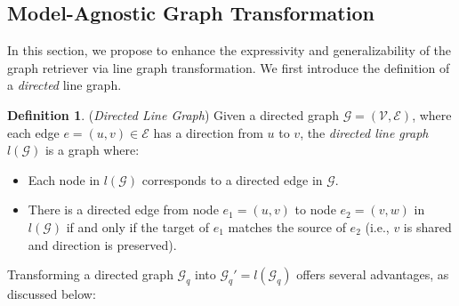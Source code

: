 \documentclass{article}
\theoremstyle{plain}
\theoremstyle{definition}
\newtheorem{definition}{Definition}
\theoremstyle{remark}
\newcommand{\ti}[1]{\textit{#1}}
\newcommand{\mcal}[1]{\mathcal{#1}}
\begin{document}
\subsection{Model-Agnostic Graph Transformation}
In this section, we propose to enhance the expressivity and generalizability of the graph retriever via line graph transformation.
We first introduce the definition of a \ti{directed} line graph.
\begin{definition} (\textit{Directed Line Graph}) \label{line_graph}
Given a directed graph $\mcal{G} = (\mcal{V}, \mcal{E})$, where each edge $e = (u, v) \in \mcal{E}$ has a direction from $u$ to $v$, the \textit{directed line graph} $l(\mcal{G})$ is a graph where:
\begin{itemize}
    \item Each node in $l(\mcal{G})$ corresponds to a directed edge in $\mcal{G}$.
    \item There is a directed edge from node $e_1 = (u, v)$ to node $e_2 = (v, w)$ in $l(\mcal{G})$ if and only if the target of $e_1$ matches the source of $e_2$ (i.e., $v$ is shared and direction is preserved).
\end{itemize}
\end{definition}
Transforming a directed graph $\mcal{G}_q$ into $\mcal{G}_q' = l(\mcal{G}_q)$ offers several advantages, as discussed below: 
\end{document}
